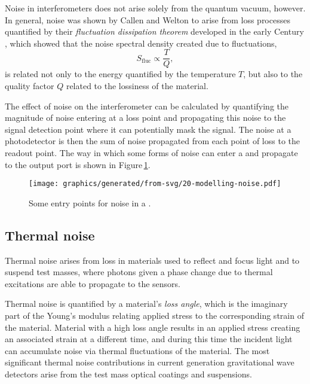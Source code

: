 Noise in interferometers does not arise solely from the quantum vacuum, however. In general, noise was shown by Callen and Welton to arise from loss processes quantified by their \emph{fluctuation dissipation theorem} developed in the early  Century \cite{Callen1951}, which showed that the noise spectral density created due to fluctuations,
\begin{equation}
  S_{\text{fluc}} \propto \frac{T}{Q},
\end{equation}
is related not only to the energy quantified by the temperature $T$, but also to the quality factor $Q$ related to the lossiness of the material.

The effect of noise on the interferometer can be calculated by quantifying the magnitude of noise entering at a loss point and propagating this noise to the signal detection point where it can potentially mask the signal. The noise at a photodetector is then the sum of noise propagated from each point of loss to the readout point. The way in which some forms of noise can enter a \MI{} and propagate to the output port is shown in Figure\,\ref{fig:modelling-noise}.

\begin{figure}
  \centering
  \texttt{[image: graphics/generated/from-svg/20-modelling-noise.pdf]}
  \caption[Some entry points for noise in a \MI{}]{\label{fig:modelling-noise}Some entry points for noise in a \MI{}.}
\end{figure}

\subsection{Thermal noise}
Thermal noise arises from loss in materials used to reflect and focus light and to suspend test masses, where photons given a phase change due to thermal excitations are able to propagate to the sensors.

Thermal noise is quantified by a material's \emph{loss angle}, which is the imaginary part of the Young's modulus relating applied stress to the corresponding strain of the material. Material with a high loss angle results in an applied stress creating an associated strain at a different time, and during this time the incident light can accumulate noise via thermal fluctuations of the material. The most significant thermal noise contributions in current generation gravitational wave detectors arise from the test mass optical coatings and suspensions.

